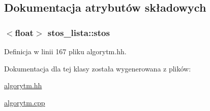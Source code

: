 \subsection{\-Dokumentacja atrybutów składowych}
\hypertarget{classstos__lista_a94fc88e5b40c7a44e2e34a6f0441853f}{
\subsubsection[{stos}]{$<$float$>$ {\bf stos\-\_\-lista\-::stos}}}\label{classstos__lista_a94fc88e5b40c7a44e2e34a6f0441853f}


\-Definicja w linii 167 pliku algorytm.\-hh.



\-Dokumentacja dla tej klasy została wygenerowana z plików\-:\begin{DoxyCompactItemize}
\item 
\hyperlink{algorytm_8hh}{algorytm.\-hh}\item 
\hyperlink{algorytm_8cpp}{algorytm.\-cpp}\end{DoxyCompactItemize}
